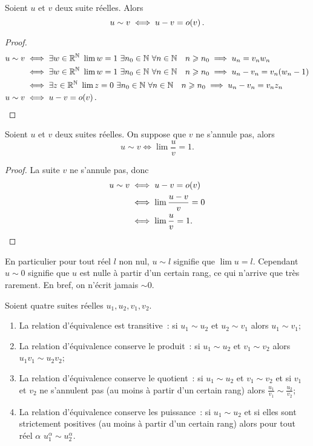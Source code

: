 \begin{prop}
  Soient \(u\) et \(v\) deux suite réelles. Alors
  \begin{equation}
    u \sim v \iff u-v = o\mathopen{}\left(v\right).
  \end{equation}
\end{prop}
\begin{proof}
  \begin{align}
    u \sim v & \iff \exists w \in \R^\N \ \lim w =1 \ \exists n_0 \in \N \ \forall n \in \N \quad n \geqslant n_0 \implies u_n= v_n w_n \\
    & \iff \exists w \in \R^\N \ \lim w =1 \ \exists n_0 \in \N \ \forall n \in \N \quad n \geqslant n_0 \implies u_n-v_n= v_n (w_n -1) \\
    & \iff \exists z \in \R^\N \ \lim z =0 \ \exists n_0 \in \N \ \forall n \in \N \quad n \geqslant n_0 \implies u_n-v_n= v_n z_n \\
    u \sim v & \iff u-v = \petito{v}.
  \end{align}
\end{proof}
\begin{prop}
  Soient \(u\) et \(v\) deux suites réelles. On suppose que \(v\) ne s'annule pas, alors
  \begin{equation}
    u \sim v \iff \lim \frac{u}{v}=1.
  \end{equation}
\end{prop}
\begin{proof}
  La suite \(v\) ne s'annule pas, donc
  \begin{align}
    u \sim v & \iff u-v = o\mathopen{}\left(v\right) \\
    & \iff \lim \frac{u-v}{v} =0 \\
    & \iff \lim \frac{u}{v} =1.
  \end{align}
\end{proof}
En particulier pour tout réel \(l\) non nul, \(u \sim l\) signifie que \(\lim u =l\). Cependant \(u \sim 0\) signifie que \(u\) est nulle à partir d'un certain rang, ce qui n'arrive que très rarement. En bref, on n'écrit jamais \(\sim 0\).
\begin{prop}
  Soient quatre suites réelles \(u_1, u_2, v_1, v_2\).
  \begin{enumerate}
  \item La relation d'équivalence est transitive~: si \(u_1 \sim u_2\) et \(u_2 \sim v_1\) alors \(u_1 \sim v_1\);  
  \item La relation d'équivalence conserve le produit~: si \(u_1 \sim u_2\) et \(v_1 \sim v_2\) alors \(u_1 v_1 \sim u_2 v_2\);
  \item La relation d'équivalence conserve le quotient~: si \(u_1 \sim u_2\) et \(v_1 \sim v_2\) et si \(v_1\) et \(v_2\) ne s'annulent pas (au moins à partir d'un certain rang) alors \(\frac{u_1}{v_1} \sim \frac{u_2}{v_2}\);
  \item La relation d'équivalence conserve les puissance~: si \(u_1 \sim u_2\) et si elles sont strictement positives (au moins à partir d'un certain rang) alors pour tout réel \(\alpha\) \(u_1^\alpha \sim u_2^\alpha\).
  \end{enumerate}
\end{prop}
